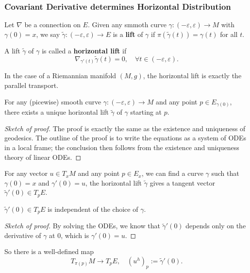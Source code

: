 \subsubsection*{Covariant Derivative determines Horizontal Distribution}
Let $\nabla$ be a connection on $E$. Given any smmoth curve $\gamma: (-\varepsilon,\varepsilon) \to M$ with $\gamma(0) = x$, 
we say $\tilde{\gamma}: (-\varepsilon,\varepsilon) \to E$ is a 
\textbf{lift} of $\gamma$ if $\pi(\tilde{\gamma}(t)) = \gamma(t)$ for all $t$. 
\begin{definition}
    A lift $\tilde{\gamma}$ of $\gamma$ is called a \textbf{horizontal lift} if 
    \begin{equation*}
        \nabla_{\gamma'(t)} \tilde{\gamma}(t) = 0, \quad \forall t\in (-\varepsilon,\varepsilon).
    \end{equation*}
\end{definition}
\begin{example}
    In the case of a Riemannian manifold $(M,g)$, the horizontal lift is exactly the parallel transport.
\end{example}
\begin{proposition}
    For any (picewise) smooth curve $\gamma: (-\varepsilon,\varepsilon) \to M$ and any point $p\in E_{\gamma(0)}$, 
    there exists a unique horizontal lift $\tilde{\gamma}$ of $\gamma$ starting at $p$.
\end{proposition}
\begin{proof}[Sketch of proof]
    The proof is exactly the same as the existence and uniqueness of geodesics. 
    The outline of the proof is to write the equations as a system of ODEs in a local frame; 
    the conclusion then follows from the existence and uniqueness theory of linear ODEs.
\end{proof}
For any vector $u\in T_x M$ and any point $p\in E_x$, 
we can find a curve $\gamma$ such that $\gamma(0)=x$ and $\gamma'(0)=u$, 
the horizontal lift $\tilde{\gamma}$ gives a tangent vector $\tilde{\gamma}'(0)\in T_p E$. 
\begin{fact}
    $\tilde{\gamma}'(0)\in T_pE$ is independent of the choice of $\gamma$.
\end{fact}
\begin{proof}[Sketch of proof]
    By solving the ODEs, we know that $\tilde{\gamma}'(0)$ depends only on the derivative of $\gamma$ at $0$, 
    which is $\gamma'(0)=u$.
\end{proof}
So there is a well-defined map 
\begin{equation*}
    T_{\pi(p)} M \to T_p E, \quad (u^h)_p := \tilde{\gamma}'(0).
\end{equation*}
